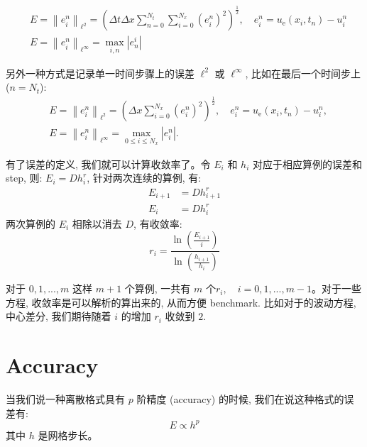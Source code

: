 \begin{equation}
\begin{aligned}
&E=\left\|e_{i}^{n}\right\|_{\ell^{2}}=\left(\Delta t \Delta x \sum_{n=0}^{N_{t}} \sum_{i=0}^{N_{x}}\left(e_{i}^{n}\right)^{2}\right)^{\frac{1}{2}}, \quad e_{i}^{n}=u_{\mathrm{e}}\left(x_{i}, t_{n}\right)-u_{i}^{n} \\
&E=\left\|e_{i}^{n}\right\|_{\ell^{\infty}}=\max _{i, n}\left|e_{n}^{i}\right|
\end{aligned}
\end{equation}


另外一种方式是记录单一时间步骤上的误差 $\ell^2$ 或 $\ell^\infty$, 比如在最后一个时间步上 ($n=N_t$):
\begin{equation}
\begin{aligned}
&E=\left\|e_{i}^{n}\right\|_{\ell^{2}}=\left(\Delta x \sum_{i=0}^{N_{x}}\left(e_{i}^{n}\right)^{2}\right)^{\frac{1}{2}}, \quad e_{i}^{n}=u_{\mathrm{e}}\left(x_{i}, t_{n}\right)-u_{i}^{n}, \\
&E=\left\|e_{i}^{n}\right\|_{\ell^{\infty}}=\max _{0 \leq i \leq N_{x}}\left|e_{i}^{n}\right| .
\end{aligned}
\end{equation}

有了误差的定义, 我们就可以计算收敛率了。令 $E_i$ 和 $h_i$ 对应于相应算例的误差和 step, 则: $E_i = Dh_i^r$, 针对两次连续的算例, 有:
\begin{equation}
    \begin{aligned}
        E_{i+1} &= Dh_{i+1}^r \\
        E_i &= Dh_i^r
    \end{aligned}
\end{equation}
两次算例的 $E_i$ 相除以消去 $D$, 有收敛率:
\begin{equation}
    r_i = \frac{\ln\left( \frac{E_{i+1}}{i}\right)}{\ln \left(\frac{h_{i+1}}{h_i}\right)}
\end{equation}

对于 $0,1,...,m$ 这样 $m+1$ 个算例, 一共有 $m$ 个$r_i, \quad i=0,1,...,m-1$。对于一些方程, 收敛率是可以解析的算出来的, 从而方便 benchmark. 比如对于的波动方程, 中心差分, 我们期待随着 $i$ 的增加 $r_i$ 收敛到 $2$.


\section{Accuracy}

当我们说一种离散格式具有 $p$ 阶精度 (accuracy) 的时候, 我们在说这种格式的误差有:
\begin{equation}
    E \propto h^p
\end{equation}
其中 $h$ 是网格步长。

